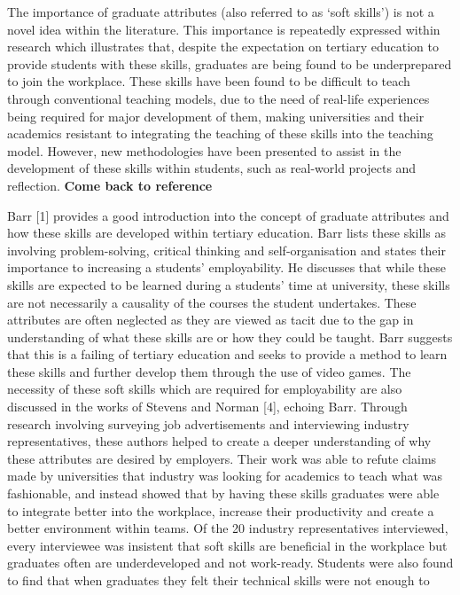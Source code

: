 \documentclass{l4proj}
\begin{document}
The importance of graduate attributes (also referred to as ‘soft skills’) is not a novel idea 
within the literature. This importance is repeatedly expressed within research which illustrates 
that, despite the expectation on tertiary education to provide students with these skills, graduates 
are being found to be underprepared to join the workplace. These skills have been found to be 
difficult to teach through conventional teaching models, due to the need of real-life experiences 
being required for major development of them, making universities and their academics resistant to 
integrating the teaching of these skills into the teaching model. However, new methodologies have 
been presented to assist in the development of these skills within students, such as real-world 
projects and reflection. \textbf{Come back to reference}
\par  
Barr [1] provides a good introduction into the concept of graduate attributes and 
how these skills are developed within tertiary education. Barr lists these skills as involving 
problem-solving, critical thinking and self-organisation and states their importance to increasing 
a students’ employability. He discusses that while these skills are expected to be learned during a 
students’ time at university, these skills are not necessarily a causality of the courses the student 
undertakes. These attributes are often neglected as they are viewed as tacit due to the gap in 
understanding of what these skills are or how they could be taught. Barr suggests that this is a 
failing of tertiary education and seeks to provide a method to learn these skills and further develop them through the use of video games. 
The necessity of these soft skills which are required for employability are also discussed in 
the works of Stevens and Norman [4], echoing Barr. Through research involving surveying job 
advertisements and interviewing industry representatives, these authors helped to create a deeper 
understanding of why these attributes are desired by employers. Their work was able to refute 
claims made by universities that industry was looking for academics to teach what was fashionable, 
and instead showed that by having these skills graduates were able to integrate better into the 
workplace, increase their productivity and create a better environment within teams.  Of the 20 
industry representatives interviewed, every interviewee was insistent that soft skills are 
beneficial in the workplace but graduates often are underdeveloped and not work-ready. Students 
were also found to find that when graduates they felt their technical skills were not enough to 
\end{document}
